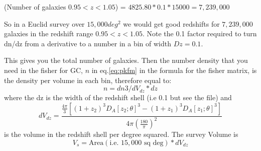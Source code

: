 (Number of galaxies $0.95<z<1.05$) = $4825.80 * 0.1 * 15000 = 7,239,000$

So in a Euclid survey over $15,000deg^2$ we would get good redshifts for $7,239,000$ galaxies in the
redshift range $0.95<z<1.05$. Note the 0.1 factor required to turn dn/dz from a derivative to a number in
a bin of width $Dz=0.1$.

This gives you the total number of galaxies. Then the number density that you need in the fisher for GC, $n$ in eq.\ref{eq:pkfm} in the formula for the fisher matrix, is the density per volume in each bin, therefore equal to: 
\begin{equation}
n = dn3 / dV_{dz} * dz 
\end{equation}
where the dz is the width of the redshift shell (i.e 0.1 but see the file) and 
\begin{equation}
dV_{dz} = \frac{\frac{4 \pi}{3} \left[ (1+z_2)^3 D_A[z_2;\theta]^3 - (1+z_1)^3 D_A[z_1;\theta]^3  \right]}{4 \pi \left(\frac{180}{\pi}\right)^2}
\end{equation}
is the volume in the redshift shell per degree squared.
The survey Volume is 
\begin{equation}
V_s = \text{Area} (\text{i.e. } 15,000 \text{ sq deg}) * dV_{dz}
\end{equation}


